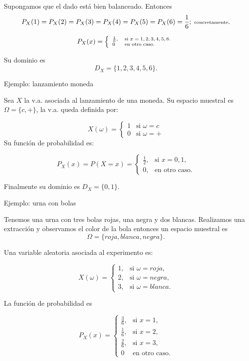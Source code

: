 \documentclass[
  letterpaper,
  DIV=11,
  numbers=noendperiod]{scrreprt}
\begin{document}
Supongamos que el dado está bien balanceado. Entonces
\[\scriptsize{P_{X}(1)=P_{X}(2)=P_{X}(3)=P_{X}(4)=P_{X}(5)=P_{X}(6)=\frac16; \mbox{  concretamente}.}\]

\[\scriptsize{
P_{X}(x)=
  \left\{
  \begin{array}{ll}
   \frac16 ,& \mbox{si } x=1,2,3,4,5,6.\\
  0 & \mbox{en otro caso.}
  \end{array}
  \right.}
\]

Su dominio es \[D_X=\{1,2,3,4,5,6\}.\]

Ejemplo: lanzamiento moneda

Sea \(X\) la v.a. asociada al lanzamiento de una moneda. Su espacio
muestral es \(\Omega=\{c,+\}\), la v.a. queda definida por:

\[X(\omega)=\left\{\begin{array}{ll} 1 & \mbox{si } \omega=c \\
0 & \mbox{si }\omega=+\end{array}\right.\] Su función de probabilidad
es:

\[P_{X}(x)=P(X=x)=\left\{\begin{array}{ll} \frac12, & \mbox{si } x=0,1,\\
0, & \mbox{en otro caso}.\end{array}\right.\]

Finalmente su dominio es \(D_X=\{0,1\}.\)

Ejemplo: urna con bolas

Tenemos una urna con tres bolas rojas, una negra y dos blancas.
Realizamos una extracción y observamos el color de la bola entonces un
espacio muestral es \[\Omega=\{roja, blanca, negra\}.\]

Una variable aleatoria asociada al experimento es:

\[X(\omega)=\left\{\begin{array}{ll} 1, & \mbox{si } \omega=roja,  \\
2, & \mbox{si }\omega=negra ,\\ 3, & \mbox{si } \omega=blanca.\end{array}\right.\]

La función de probabilidad es

\[P_{X}(x)=\left\{\begin{array}{ll} \frac36, & \mbox{si } x=1,\\[0.5ex]
\frac16, & \mbox{si } x=2,\\ \frac26, & \mbox{si } x=3,\\ 0 & \mbox{en otro
caso.}\end{array}\right.\]
\end{document}
